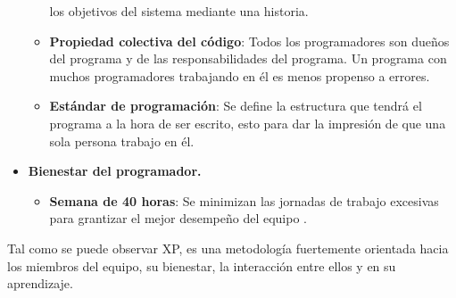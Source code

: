 \begin{itemize}
\begin{itemize}
			los objetivos del sistema mediante una historia.
			\item \textbf{Propiedad colectiva del código}: Todos los programadores son 
			dueños del programa y de las responsabilidades del programa. Un programa con 
			muchos programadores trabajando en él es menos propenso a errores. 
			\item \textbf{Estándar de programación}: Se define la estructura que tendrá 
			el programa a la hora de ser escrito, esto para dar la impresión de que una 
			sola persona trabajo en él.
		\end{itemize}
	\item \textbf{Bienestar del programador.}
		\begin{itemize}
			\item \textbf{Semana de 40 horas}: Se minimizan las jornadas de trabajo 
			excesivas para grantizar el mejor desempeño del equipo
			\cite{Ref_XPPrincipios}.
		\end{itemize}
\end{itemize}
Tal como se puede observar XP, es una metodología fuertemente orientada hacia los 
miembros del equipo, su bienestar, la interacción entre ellos y en su aprendizaje.

